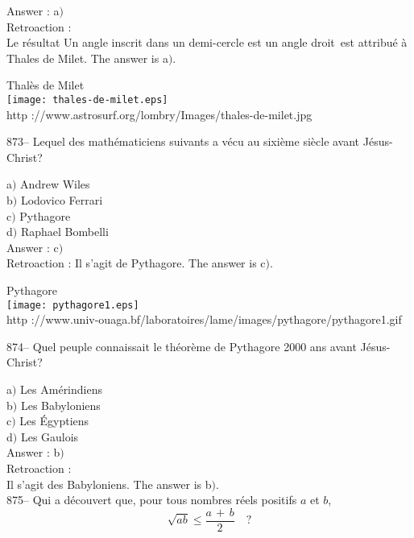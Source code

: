 ﻿\documentclass[letterpaper, 12pt]{article}
\begin{document}
Answer : a$)$\\

Retroaction :\\
Le r\'esultat \og Un angle inscrit dans un demi-cercle est un angle
droit\fg\ est attribu\'e \`a Thales de Milet. The answer is a$)$.\\

        \begin{center}
        Thal\`es de Milet\\
    \texttt{[image: thales-de-milet.eps]}\\
        {\footnotesize http
://www.astrosurf.org/lombry/Images/thales-de-milet.jpg}
    \end{center}

873-- Lequel des math\'ematiciens suivants a v\'ecu au sixi\`eme
si\`ecle avant J\'esus-Christ?

a$)$ Andrew Wiles \\
b$)$ Lodovico Ferrari \\
c$)$ Pythagore \\
d$)$ Raphael Bombelli \\

Answer : c$)$\\

Retroaction :
Il s'agit de Pythagore. The answer is c$)$.\\

        \begin{center}
        Pythagore\\
    \texttt{[image: pythagore1.eps]}\\
        {\footnotesize http
://www.univ-ouaga.bf/laboratoires/lame/images/pythagore/pythagore1.gif}
    \end{center}

874-- Quel peuple connaissait le th\'eor\`eme de Pythagore 2000 ans
avant J\'esus-Christ?

a$)$ Les Am\'erindiens \\
b$)$ Les Babyloniens \\
c$)$ Les \'Egyptiens \\
d$)$ Les Gaulois \\

Answer : b$)$\\

Retroaction : \\
Il s'agit des Babyloniens. The answer is b$)$.\\

875-- Qui a d\'ecouvert que, pour tous nombres r\'eels positifs $a$ et $b$,
$$\sqrt{ab}\le\displaystyle\frac{a\,+\,b}2\quad?$$
\end{document}
